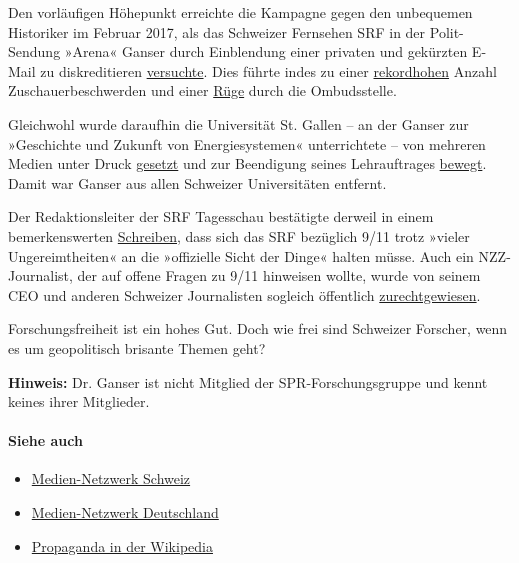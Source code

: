 Den vorläufigen Höhepunkt erreichte die Kampagne gegen den unbequemen
Historiker im Februar 2017, als das Schweizer Fernsehen SRF in der
Polit-Sendung »Arena« Ganser durch Einblendung einer privaten und
gekürzten E-Mail zu diskreditieren
\href{https://www.youtube.com/watch?v=vBYPSuiY8eE}{versuchte}. Dies
führte indes zu einer
\href{http://www.tagesanzeiger.ch/kultur/fernsehen/ganserarena-noch-nie-gab-es-so-viele-beschwerden/story/14245665}{rekordhohen}
Anzahl Zuschauerbeschwerden und einer
\href{https://www.srgd.ch/de/aktuelles/news/2017/04/11/arena-uber-unehrliche-medien-beanstandet/}{Rüge}
durch die Ombudsstelle.

Gleichwohl wurde daraufhin die Universität St. Gallen -- an der Ganser
zur »Geschichte und Zukunft von Energiesystemen« unterrichtete -- von
mehreren Medien unter Druck
\href{https://www.aargauerzeitung.ch/schweiz/ein-lehrauftrag-fuer-verschwoerungstheoretiker-ganser-professoren-kritisieren-die-hsg-131311387}{gesetzt}
und zur Beendigung seines Lehrauftrages
\href{https://www.aargauerzeitung.ch/schweiz/daniele-ganser-star-der-verschwoerungsszene-verstossenes-kind-der-wissenschaft-132406642}{bewegt}.
Damit war Ganser aus allen Schweizer Universitäten entfernt.

Der Redaktionsleiter der SRF Tagesschau bestätigte derweil in einem
bemerkenswerten
\href{https://www.srgd.ch/de/aktuelles/news/2017/06/11/srf-online-beitrag-flugzeug-absturz-auf-pentagon-die-erinnerung-911-beanstandet/}{Schreiben},
dass sich das SRF bezüglich 9/11 trotz »vieler Ungereimtheiten« an die
»offizielle Sicht der Dinge« halten müsse. Auch ein NZZ-Journalist, der
auf offene Fragen zu 9/11 hinweisen wollte, wurde von seinem CEO und
anderen Schweizer Journalisten sogleich öffentlich
\href{http://www.stefan-schaer.ch/2017/03/01/jan-flueckigers-kehrtwende-oder-wie-man-journalisten-mundtot-macht/}{zurechtgewiesen}.

Forschungsfreiheit ist ein hohes Gut. Doch wie frei sind Schweizer
Forscher, wenn es um geopolitisch brisante Themen geht?

\textbf{Hinweis:} Dr. Ganser ist nicht Mitglied der SPR-Forschungsgruppe
und kennt keines ihrer Mitglieder.

\hypertarget{siehe-auch}{%
\paragraph{Siehe auch}\label{siehe-auch}}

\begin{itemize}
\tightlist
\item
  \href{https://swprs.org/netzwerk-medien-schweiz/}{Medien-Netzwerk
  Schweiz}
\item
  \href{https://swprs.org/netzwerk-medien-deutschland/}{Medien-Netzwerk
  Deutschland}
\item
  \href{https://swprs.org/propaganda-in-der-wikipedia/}{Propaganda in
  der Wikipedia}
\end{itemize}

